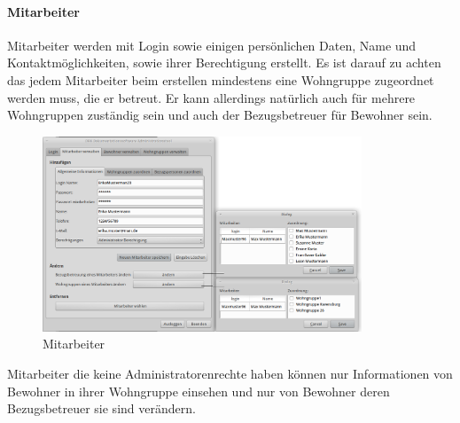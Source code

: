\paragraph{Mitarbeiter}
Mitarbeiter werden mit Login sowie einigen persönlichen Daten, Name und Kontaktmöglichkeiten, sowie ihrer Berechtigung erstellt. Es ist darauf zu achten das jedem Mitarbeiter beim erstellen mindestens eine Wohngruppe zugeordnet werden muss, die er betreut. Er kann allerdings natürlich auch für mehrere Wohngruppen zuständig sein und auch der Bezugsbetreuer für Bewohner sein.
\begin{figure}[h]
	\begin{center}
		\includegraphics[keepaspectratio=true, width=0.85\textwidth]{pics/admin1.png}
		\caption{Mitarbeiter}
		\label{Admindialog Mitarbeiter}
	\end{center}
\end{figure}
\FloatBarrier
\noindent
Mitarbeiter die keine Administratorenrechte haben können nur Informationen von Bewohner in ihrer Wohngruppe einsehen und nur von Bewohner deren Bezugsbetreuer sie sind verändern.
\newpage
